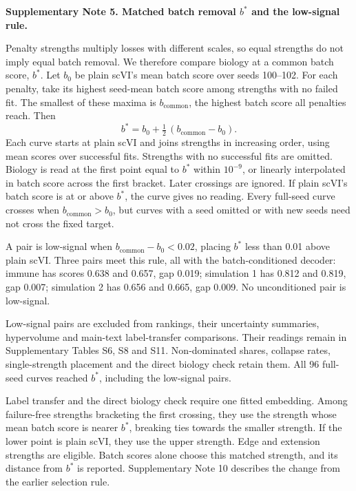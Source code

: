 \medskip\noindent\textbf{Supplementary Note 5. Matched batch removal $b^*$ and the low-signal rule.}\par\smallskip
\begingroup\small\setlength{\parskip}{3pt}
Penalty strengths multiply losses with different scales, so equal strengths do not imply equal batch removal. We therefore compare biology at a common batch score, $b^*$. Let $b_0$ be plain scVI's mean batch score over seeds 100--102. For each penalty, take its highest seed-mean batch score among strengths with no failed fit. The smallest of these maxima is $b_{\mathrm{common}}$, the highest batch score all penalties reach. Then
\begin{equation}
b^*=b_0+\tfrac12\,(b_{\mathrm{common}}-b_0).
\label{eq:s5-bstar}
\end{equation}
Each curve starts at plain scVI and joins strengths in increasing order, using mean scores over successful fits. Strengths with no successful fits are omitted. Biology is read at the first point equal to $b^*$ within $10^{-9}$, or linearly interpolated in batch score across the first bracket. Later crossings are ignored. If plain scVI's batch score is at or above $b^*$, the curve gives no reading. Every full-seed curve crosses when $b_{\mathrm{common}}>b_0$, but curves with a seed omitted or with new seeds need not cross the fixed target.

A pair is low-signal when $b_{\mathrm{common}}-b_0<0.02$, placing $b^*$ less than 0.01 above plain scVI. Three pairs meet this rule, all with the batch-conditioned decoder: immune has scores 0.638 and 0.657, gap 0.019; simulation 1 has 0.812 and 0.819, gap 0.007; simulation 2 has 0.656 and 0.665, gap 0.009. No unconditioned pair is low-signal.

Low-signal pairs are excluded from rankings, their uncertainty summaries, hypervolume and main-text label-transfer comparisons. Their readings remain in Supplementary Tables S6, S8 and S11. Non-dominated shares, collapse rates, single-strength placement and the direct biology check retain them. All 96 full-seed curves reached $b^*$, including the low-signal pairs.

Label transfer and the direct biology check require one fitted embedding. Among failure-free strengths bracketing the first crossing, they use the strength whose mean batch score is nearer $b^*$, breaking ties towards the smaller strength. If the lower point is plain scVI, they use the upper strength. Edge and extension strengths are eligible. Batch scores alone choose this matched strength, and its distance from $b^*$ is reported. Supplementary Note 10 describes the change from the earlier selection rule.
\par\endgroup
